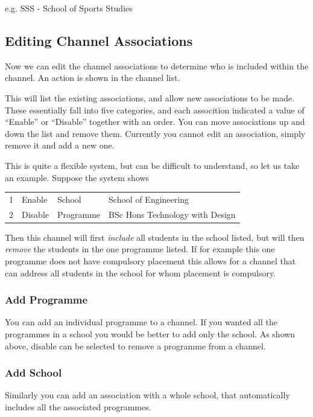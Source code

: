 \documentclass[12 pt]{book}
\begin{document}
e.g. SSS - School of Sports Studies

\subsection{Editing Channel Associations}

Now we can edit the channel associations to determine who is included within
the channel. An  action is shown in the channel list.

This will list the existing associations, and allow new associations to be
made. These essentially fall into five categories, and each assocition 
indicated a value of ``Enable'' or ``Disable'' together with an order. You
can move associations up and down the list and remove them. Currently you
cannot edit an association, simply remove it and add a new one.

This is quite a flexible system, but can be difficult to understand, so
let us take an example. Suppose the system shows

\begin{tabular}{llll}
1 & Enable & School & School of Engineering \\
2 & Disable & Programme & BSc Hons Technology with Design \\
\end{tabular}

Then this channel will first \emph{include} all students in the school listed,
but will then \emph{remove} the students in the one programme listed. If for
example this one programme does not have compulsory placement this allows for
a channel that can address all students in the school for whom placement is
compulsory.

\subsubsection{Add Programme}

You can add an individual programme to a channel. If you wanted all the
programmes in a school you would be better to add only the school. As shown
above, disable can be selected to remove a programme from a channel.

\subsubsection{Add School}

Similarly you can add an association with a whole school, that automatically
includes all the associated programmes.
\end{document}
